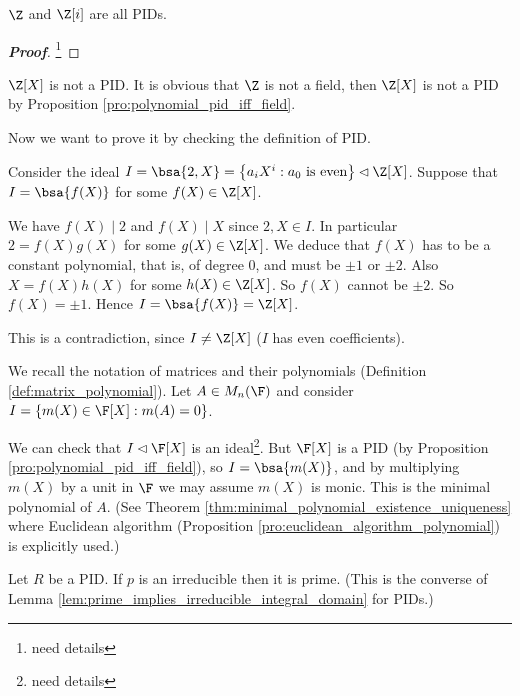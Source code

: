 \begin{proposition}\label{pro:pid_examples}
$\Z$ and $\Z[i]$ are all PIDs.
\end{proposition}

\begin{proof}[\bf Proof]
\footnote{need details}
\end{proof}

\begin{example}
$\Z[X]$ is not a PID. It is obvious that $\Z$ is not a field, then $\Z[X]$ is not a PID by Proposition \ref{pro:polynomial_pid_iff_field}.

Now we want to prove it by checking the definition of PID.

Consider the ideal $I = \bsa{2,X} = \left\{a_iX^i : a_0 \text{ is even}\right\} \lhd \Z[X]$. Suppose that $I = \bsa{f(X)}$ for some $f(X) \in \Z[X]$.

We have $f(X)\mid 2$ and $f(X)\mid X$ since $2,X \in I$. In particular $2 = f(X)g(X)$ for some $g(X) \in \Z[X]$. We deduce that $f(X)$ has to be a constant polynomial, that is, of degree 0, and must be $\pm 1$ or $\pm 2$. Also $X = f(X)h(X)$ for some $h(X) \in \Z[X]$. So $f(X)$ cannot be $\pm 2$. So $f(X) = \pm 1$. Hence $I = \bsa{f(X)} = \Z[X]$.

This is a contradiction, since $I \neq \Z[X]$ ($I$ has even coefficients).%
\end{example}

\begin{example}
We recall the notation of matrices and their polynomials (Definition \ref{def:matrix_polynomial}). Let $A \in M_{n}(\F)$ and consider $I = \{m(X) \in \F[X] : m(A) = 0\}$.

We can check that $I \lhd \F[X]$ is an ideal\footnote{need details}. But $\F[X]$ is a PID (by Proposition \ref{pro:polynomial_pid_iff_field}), so $I = \bsa{m(X)}$, and by multiplying $m(X)$ by a
unit in $\F$ we may assume $m(X)$ is monic. This is the minimal polynomial of $A$. (See Theorem \ref{thm:minimal_polynomial_existence_uniqueness} where Euclidean algorithm (Proposition
\ref{pro:euclidean_algorithm_polynomial}) is explicitly used.) %
\end{example}


\begin{lemma}\label{lem:pid_irreducible_prime}
Let $R$ be a PID. If $p$ is an irreducible then it is prime. (This is the converse of Lemma \ref{lem:prime_implies_irreducible_integral_domain} for PIDs.)
\end{lemma}

